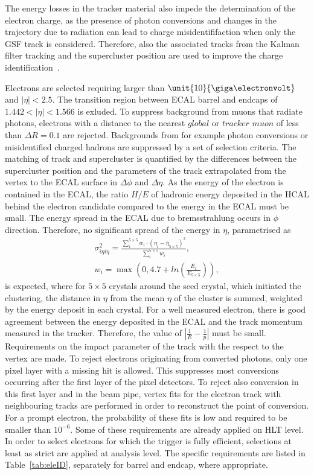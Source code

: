 The energy losses in the tracker material also impede the determination of the electron charge, as the presence of photon conversions and changes in the trajectory due to radiation can lead to charge misidentififaction when only the GSF track is considered. Therefore, also the associated tracks from the Kalman filter tracking and the supercluster position are used to improve the charge identification~\cite{Khachatryan:2015hwa}.

Electrons are selected requiring \pt larger than $\unit{10}{\giga\electronvolt}$ and $|\eta| < 2.5$. The transition region between ECAL barrel and endcaps of $1.442 < |\eta| < 1.566$ is exluded. To suppress background from muons that radiate photons, electrons with a distance to the nearest $\textit{global}$ or $\textit{tracker muon}$ of less than $\Delta R = 0.1$ are rejected. Backgrounds from for example photon conversions or misidentified charged hadrons are suppressed by a set of selection criteria. The matching of track and supercluster is quantified by the differences between the supercluster position and the parameters of the track extrapolated from the vertex to the ECAL surface in $\Delta\phi$ and $\Delta\eta$. As the energy of the electron is contained in the ECAL, the ratio $H/E$ of hadronic energy deposited in the HCAL behind the electron candidate compared to the energy in the ECAL must be small. The energy spread in the ECAL due to bremsstrahlung occurs in $\phi$ direction. Therefore, no significant spread of the energy in $\eta$, parametrised as
\begin{eqnarray}
\sigma_{i\eta i\eta}^2 = \frac{\sum\limits_i^{5\times 5} w_i\cdot \left(\eta_i - \bar{\eta}_{5\times 5}\right)^2}{\sum\limits_{i}^{5\times 5} w_i},\\
w_i = \max\left(0,4.7 + ln\left(\frac{E_i}{E_{5 \times 5}}\right)\right),
\end{eqnarray}
is expected, where for $5\times 5$ crystals around the seed crystal, which initiated the clustering, the distance in $\eta$ from the mean $\eta$ of the cluster is summed, weighted by the energy deposit in each crystal. For a well measured electron, there is good agreement between the energy deposited in the ECAL and the track momentum measured in the tracker. Therefore, the value of $\left| \frac{1}{E} - \frac{1}{p}\right|$ must be small. Requirements on the impact parameter of the track with the respect to the vertex are made. To reject electrons originating from converted photons, only one pixel layer with a missing hit is allowed. This suppresses most conversions occurring after the first layer of the pixel detectors. To reject also conversion in this first layer and in the beam pipe, vertex fits for the electron track with neighbouring tracks are performed in order to reconstruct the point of conversion. For a prompt electron, the probability of these fits is low and required to be smaller than $10^{-6}.$ Some of these requirements are already applied on HLT level. In order to select electrons for which the trigger is fully efficient, selections at least as strict are applied at analysis level. The specific requirements are listed in Table~\ref{tab:eleID}, separately for barrel and endcap, where appropriate. 
